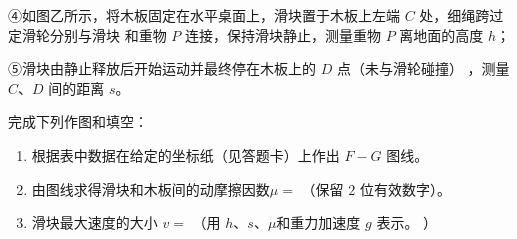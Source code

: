\begin{enumerate}
④如图乙所示，将木板固定在水平桌面上，滑块置于木板上左端 $ C $ 处，细绳跨过定滑轮分别与滑块
和重物 $ P $ 连接，保持滑块静止，测量重物 $ P $ 离地面的高度 $ h $；


⑤滑块由静止释放后开始运动并最终停在木板上的 $ D $ 点（未与滑轮碰撞）
，测量 $ C $、$ D $ 间的距离 $ s $。

完成下列作图和填空：
\begin{enumerate}
\renewcommand{\labelenumi}{\arabic{enumi}.}
\item
根据表中数据在给定的坐标纸（见答题卡）上作出 $ F - G $ 图线。
\begin{figure}[h!]
\centering

\end{figure}

\banswer{
  
}


\item 
由图线求得滑块和木板间的动摩擦因数$ \mu = $  （保留 $ 2 $ 位有效数字）。


\item 
滑块最大速度的大小 $ v= $  （用 $ h $、$ s $、$ \mu $和重力加速度 $ g $ 表示。
）

\end{enumerate}


\banswer{

}





\end{enumerate}

